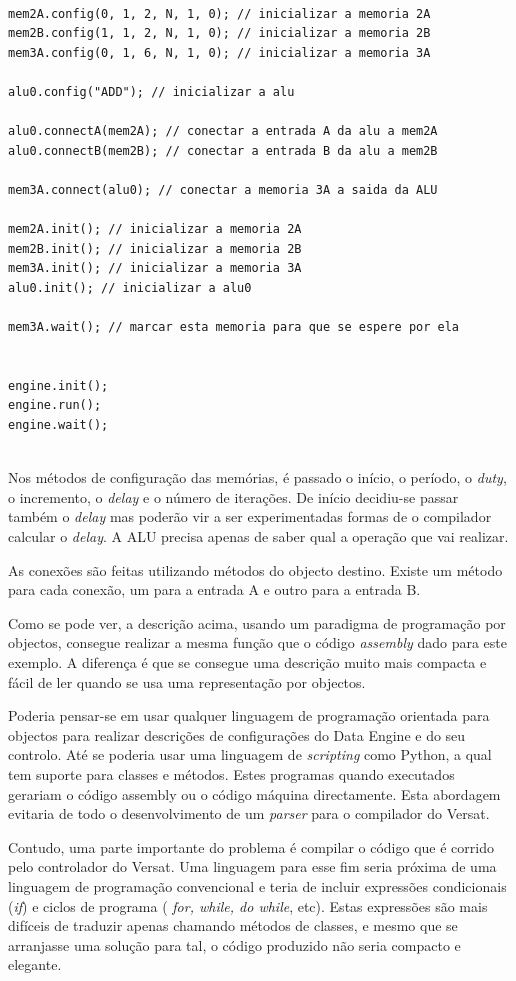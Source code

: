 \begin{lstlisting}

mem2A.config(0, 1, 2, N, 1, 0); // inicializar a memoria 2A
mem2B.config(1, 1, 2, N, 1, 0); // inicializar a memoria 2B
mem3A.config(0, 1, 6, N, 1, 0); // inicializar a memoria 3A

alu0.config("ADD"); // inicializar a alu

alu0.connectA(mem2A); // conectar a entrada A da alu a mem2A
alu0.connectB(mem2B); // conectar a entrada B da alu a mem2B

mem3A.connect(alu0); // conectar a memoria 3A a saida da ALU

mem2A.init(); // inicializar a memoria 2A
mem2B.init(); // inicializar a memoria 2B
mem3A.init(); // inicializar a memoria 3A
alu0.init(); // inicializar a alu0

mem3A.wait(); // marcar esta memoria para que se espere por ela


engine.init();
engine.run();
engine.wait();


\end{lstlisting}

Nos métodos de configuração das memórias, é passado o início, o
período, o {\it duty}, o incremento, o {\it delay} e o número de
iterações. De início decidiu-se passar também o {\it delay} mas
poderão vir a ser experimentadas formas de o compilador calcular o
{\it delay}.  A ALU precisa apenas de saber qual a operação que vai
realizar.

As conexões são feitas utilizando métodos do objecto destino. Existe
um método para cada conexão, um para a entrada A e outro para a
entrada B.

Como se pode ver, a descrição acima, usando um paradigma de
programação por objectos, consegue realizar a mesma função que o
código {\it assembly} dado para este exemplo. A diferença é que se
consegue uma descrição muito mais compacta e fácil de ler quando se
usa uma representação por objectos.

Poderia pensar-se em usar qualquer linguagem de programação orientada
para objectos para realizar descrições de configurações do Data Engine
e do seu controlo. Até se poderia usar uma linguagem de {\it
  scripting} como Python, a qual tem suporte para classes e
métodos. Estes programas quando executados gerariam o código assembly
ou o código máquina directamente. Esta abordagem evitaria de todo o
desenvolvimento de um {\em parser} para o compilador do Versat.

Contudo, uma parte importante do problema é compilar o código que é
corrido pelo controlador do Versat. Uma linguagem para esse fim seria
próxima de uma linguagem de programação convencional e teria de
incluir expressões condicionais ({\it if}) e ciclos de programa ({\it
  for, while, do while}, etc). Estas expressões são mais difíceis de
traduzir apenas chamando métodos de classes, e mesmo que se arranjasse
uma solução para tal, o código produzido não seria compacto e
elegante.


